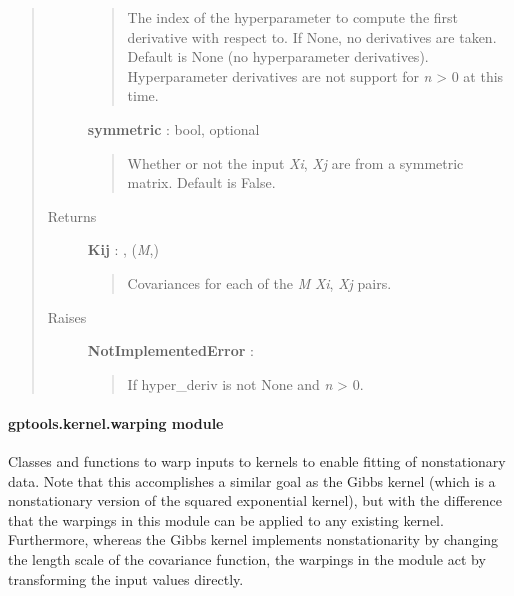 \documentclass[letterpaper,10pt,english]{sphinxmanual}
\begin{document}
\begin{fulllineitems}
\begin{fulllineitems}
\begin{quote}
\begin{description}
\begin{quote}
The index of the hyperparameter to compute the first derivative
with respect to. If None, no derivatives are taken. Default is None
(no hyperparameter derivatives). Hyperparameter derivatives are not
support for \emph{n} \textgreater{} 0 at this time.
\end{quote}

\textbf{symmetric} : bool, optional
\begin{quote}

Whether or not the input \emph{Xi}, \emph{Xj} are from a symmetric matrix.
Default is False.
\end{quote}

\item[{Returns}] \leavevmode
\textbf{Kij} : , (\emph{M},)
\begin{quote}

Covariances for each of the \emph{M} \emph{Xi}, \emph{Xj} pairs.
\end{quote}

\item[{Raises}] \leavevmode
\textbf{NotImplementedError} :
\begin{quote}

If hyper\_deriv is not None and \emph{n} \textgreater{} 0.
\end{quote}

\end{description}\end{quote}

\end{fulllineitems}


\end{fulllineitems}



\paragraph{gptools.kernel.warping module}
\label{gptools.kernel:module-gptools.kernel.warping}\label{gptools.kernel:gptools-kernel-warping-module}
Classes and functions to warp inputs to kernels to enable fitting of
nonstationary data. Note that this accomplishes a similar goal as the Gibbs
kernel (which is a nonstationary version of the squared exponential kernel), but
with the difference that the warpings in this module can be applied to any
existing kernel. Furthermore, whereas the Gibbs kernel implements
nonstationarity by changing the length scale of the covariance function, the
warpings in the module act by transforming the input values directly.
\end{document}
